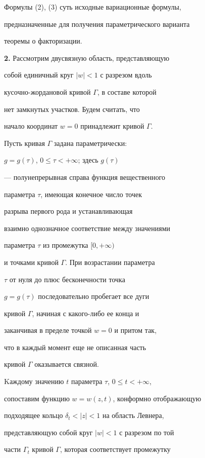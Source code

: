 Формулы (2), (3) суть исходные вариационные формулы, 


предназначенные для получения параметрического варианта


теоремы о факторизации.


\medskip





{\bf 2.} Рассмотрим двусвязную область, представляющую


собой единичный круг $|w|<1$ с разрезом вдоль 


кусочно-жордановой кривой $\Gamma$, в составе которой


нет замкнутых участков. Будем считать, что


начало координат $w=0$ принадлежит кривой $\Gamma$.


Пусть кривая $\Gamma$ задана параметрически: 


$g=g(\tau)$, $0\le\tau<+\infty$; здесь $g(\tau)$


--- полунепрерывная справа функция вещественного


параметра $\tau$, имеющая конечное число точек


разрыва первого рода и устанавливающая 


взаимно однозначное соответствие между значениями 


параметра $\tau$ из промежутка $[0,+\infty)$ 


и точками кривой $\Gamma$. При возрастании параметра


$\tau$ от нуля до плюс бесконечности точка


$g=g(\tau)$ последовательно пробегает все дуги


кривой $\Gamma$, начиная с какого-либо ее конца и


заканчивая в пределе точкой $w=0$ и притом так,


что в каждый момент еще не описанная часть


кривой $\Gamma$ оказывается связной.





Kаждому значению $t$ параметра $\tau$, $0\le t<+\infty$,


сопоставим функцию $w=w(z,t)$, конформно отображающую


подходящее кольцо $\delta_{t}<|z|<1$ на область Левнера,


представляющую собой круг $|w|<1$ с разрезом по той


части $\Gamma_{t}$ кривой $\Gamma$, которая соответствует промежутку


